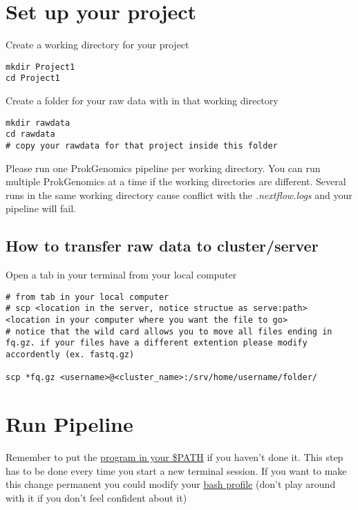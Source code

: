\documentclass[
]{book}
\begin{document}
\hypertarget{set-up-your-project}{%
\chapter{Set up your project}\label{set-up-your-project}}

Create a working directory for your project

\begin{verbatim}
mkdir Project1
cd Project1
\end{verbatim}

Create a folder for your raw data with in that working directory

\begin{verbatim}
mkdir rawdata
cd rawdata
# copy your rawdata for that project inside this folder
\end{verbatim}

Please run one ProkGenomics pipeline per working directory. You can run multiple ProkGenomics at a time if the working directories are different. Several runs in the same working directory cause conflict with the \emph{.nextflow.logs} and your pipeline will fail.

\hypertarget{how-to-transfer-raw-data-to-clusterserver}{%
\section{How to transfer raw data to cluster/server}\label{how-to-transfer-raw-data-to-clusterserver}}

Open a tab in your terminal from your local computer

\begin{verbatim}
# from tab in your local computer
# scp <location in the server, notice structue as serve:path> <location in your computer where you want the file to go>
# notice that the wild card allows you to move all files ending in fq.gz. if your files have a different extention please modify accordently (ex. fastq.gz)

scp *fq.gz <username>@<cluster_name>:/srv/home/username/folder/
\end{verbatim}

\hypertarget{run-pipeline}{%
\chapter{Run Pipeline}\label{run-pipeline}}

Remember to put the \href{getting-started.html}{program in your \$PATH} if you haven't done it. This step has to be done every time you start a new terminal session. If you want to make this change permanent you could modify your \href{https://stackoverflow.com/questions/14637979/how-to-permanently-set-path-on-linux-unix}{bash profile} (don't play around with it if you don't feel confident about it)
\end{document}
